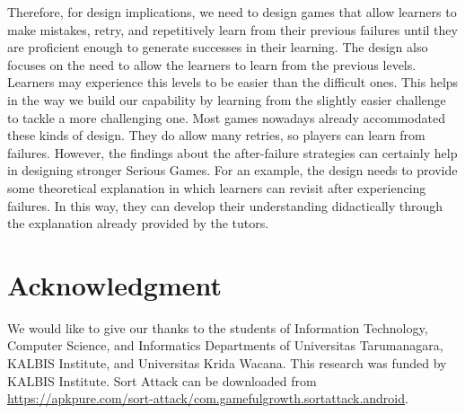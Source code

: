 \documentclass[conference]{IEEEtran}
\begin{document}
Therefore, for design implications, we need to design games that allow learners to make mistakes, retry, and repetitively learn from their previous failures until they are proficient enough to generate successes in their learning. The design also focuses on the need to allow the learners to learn from the previous levels. Learners may experience this levels to be easier than the difficult ones. This helps in the way we build our capability by learning from the slightly easier challenge to tackle a more challenging one. Most games nowadays already accommodated these kinds of design. They do allow many retries, so players can learn from failures. However, the findings about the after-failure strategies can certainly help in designing stronger Serious Games. For an example, the design needs to provide some theoretical explanation in which learners can revisit after experiencing failures. In this way, they can develop their understanding didactically through the explanation already provided by the tutors. 


\section*{Acknowledgment}

We would like to give our thanks to the students of Information Technology, Computer Science, and Informatics Departments of Universitas Tarumanagara, KALBIS Institute, and Universitas Krida Wacana. This research was funded by KALBIS Institute. Sort Attack can be downloaded from \url{https://apkpure.com/sort-attack/com.gamefulgrowth.sortattack.android}.



\end{document}
